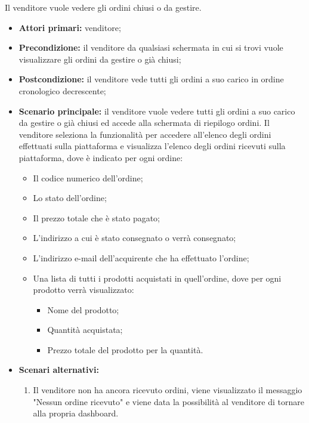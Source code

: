 Il venditore vuole vedere gli ordini chiusi o da gestire.
\begin{itemize}
    \item \textbf{Attori primari:} venditore;
    \item \textbf{Precondizione:} il venditore da qualsiasi schermata in cui si trovi vuole visualizzare gli ordini da gestire o già chiusi;
    \item \textbf{Postcondizione:} il venditore vede tutti gli ordini a suo carico in ordine cronologico decrescente;
    \item \textbf{Scenario principale:} il venditore vuole vedere tutti gli ordini a suo carico da gestire o già chiusi ed accede alla schermata di riepilogo ordini. Il venditore seleziona la funzionalità per accedere all'elenco degli ordini effettuati sulla piattaforma e visualizza l'elenco degli ordini ricevuti sulla piattaforma, dove è indicato per ogni ordine:
    \begin{itemize}
    	\item Il codice numerico dell'ordine;
    	\item Lo stato dell'ordine;
    	\item Il prezzo totale che è stato pagato;
    	\item L'indirizzo a cui è stato consegnato o verrà consegnato;
    	\item L'indirizzo e-mail dell'acquirente che ha effettuato l'ordine;
    	\item Una lista di tutti i prodotti acquistati in quell'ordine, dove per ogni prodotto verrà visualizzato:
    	\begin{itemize}
    		\item Nome del prodotto;
    		\item Quantità acquistata;
    		\item Prezzo totale del prodotto per la quantità.
    	\end{itemize}
    \end{itemize}
	\item \textbf{Scenari alternativi:} 
	\begin{enumerate}[label=\lett]
		\item Il venditore non ha ancora ricevuto ordini, viene visualizzato il messaggio "Nessun ordine ricevuto" e viene data la possibilità al venditore di tornare alla propria dashboard.
	\end{enumerate}
\end{itemize}

